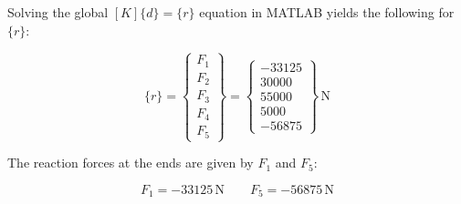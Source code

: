\documentclass[../main.tex]{subfiles}
\begin{document}

Solving the global  \([K]\{d\} = \{r\}\) equation in MATLAB yields the following for \(\{r\}\):

\[
    \{r\} =
    \begin{Bmatrix}
        F_1 \\ F_2 \\ F_3 \\ F_4 \\ F_5
    \end{Bmatrix}
    =
    \begin{Bmatrix}
        -33125 \\ 30000 \\ 55000 \\ 5000 \\ -56875
    \end{Bmatrix}   
    \, \unit{\newton}
\]

The reaction forces at the ends are given by \(F_1\) and \(F_5\):

\[
    \boxed{F_1 = -33125 \, \unit{\newton} \quad \quad F_5 = -56875 \, \unit{\newton}}
\]
\end{document}
